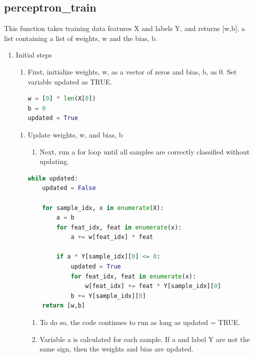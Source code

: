 \documentclass[11pt]{article}
\theoremstyle{definition}
\begin{document}
\subsection{perceptron\_train}
This function takes training data features \textsf{X} and labels \textsf{Y}, and returns \textsf{[w,b]}, a list containing a list of weights, \textsf{w} and the bias, \textsf{b}.
\begin{enumerate}
    \item Initial steps
    \begin{enumerate}
        \item First, initialize weights, \textsf{w}, as a vector of zeros and bias, \textsf{b}, as 0. Set variable \textsf{updated} as TRUE.
\begin{lstlisting}[language=python, frame=single]
w = [0] * len(X[0])
b = 0
updated = True
\end{lstlisting}
\end{enumerate}
\begin{enumerate}
    \item Update weights, \textsf{w}, and bias, \textsf{b}
    \begin{enumerate}
        \item Next, run a for loop until all samples are correctly classified without updating.
    \end{enumerate}
\begin{lstlisting}[language=python, frame=single]
while updated:
    updated = False
    
    for sample_idx, x in enumerate(X):
    	a = b
    	for feat_idx, feat in enumerate(x):
    		a += w[feat_idx] * feat
    
    	if a * Y[sample_idx][0] <= 0:
    		updated = True
    		for feat_idx, feat in enumerate(x):
    			w[feat_idx] += feat * Y[sample_idx][0]
    		b += Y[sample_idx][0]
    return [w,b]
\end{lstlisting}
        \begin{enumerate}
            \item To do so, the code continues to run as long as \textsf{updated = TRUE}.
            \item Variable \textsf{a} is calculated for each sample. If \textsf{a} and label \textsf{Y} are not the same sign, then the weights and bias are updated.
        \end{enumerate}
    \end{enumerate}
\end{enumerate}

\clearpage
\end{document}
